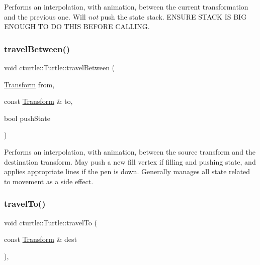 Performs an interpolation, with animation, between the current transformation and the previous one. Will {\itshape not} push the state stack. E\+N\+S\+U\+RE S\+T\+A\+CK IS B\+IG E\+N\+O\+U\+GH TO DO T\+H\+IS B\+E\+F\+O\+RE C\+A\+L\+L\+I\+NG. \mbox{\label{classcturtle_1_1Turtle_a1fada959d0f1bd31b3854adea6d3d6de}} 
\subsubsection{\texorpdfstring{travel\+Between()}{travelBetween()}}
{\footnotesize\ttfamily void cturtle\+::\+Turtle\+::travel\+Between (\begin{DoxyParamCaption}\item[{\hyperlink{classcturtle_1_1Transform}{Transform}}]{from,  }\item[{const \hyperlink{classcturtle_1_1Transform}{Transform} \&}]{to,  }\item[{bool}]{push\+State }\end{DoxyParamCaption})\hspace{0.3cm}{\ttfamily [protected]}}

Performs an interpolation, with animation, between the source transform and the destination transform. May push a new fill vertex if filling and pushing state, and applies appropriate lines if the pen is down. Generally manages all state related to movement as a side effect. \mbox{\label{classcturtle_1_1Turtle_af838da6166c05227dac1a8b57ca27414}} 
\subsubsection{\texorpdfstring{travel\+To()}{travelTo()}}
{\footnotesize\ttfamily void cturtle\+::\+Turtle\+::travel\+To (\begin{DoxyParamCaption}\item[{const \hyperlink{classcturtle_1_1Transform}{Transform} \&}]{dest }\end{DoxyParamCaption})\hspace{0.3cm}{\ttfamily [inline]}, {\ttfamily [protected]}}

